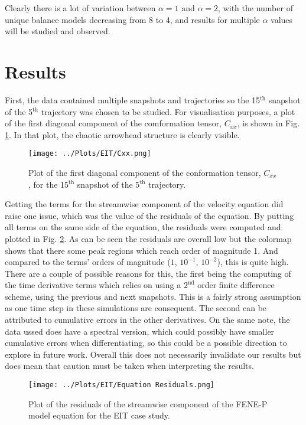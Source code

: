 \documentclass[12pt]{report} %
\begin{document}
Clearly there is a lot of variation between $\alpha =1$ and $\alpha = 2$, with the number of unique balance models decreasing from 8 to 4, and results for multiple $\alpha$ values will be studied and observed.

\newpage

\section{Results}

First, the data contained multiple snapshots and trajectories so the 15$^{\text{th}}$ snapshot of the 5$^{\text{th}}$ trajectory was chosen to be studied. For visualisation purposes, a plot of the first diagonal component of the comformation tensor, $C_{xx}$, is shown in Fig. \ref{fig:EIT_Cxx}. In that plot, the chaotic arrowhead structure is clearly visible.

\begin{figure}[htbp]
  \centering
  \texttt{[image: ../Plots/EIT/Cxx.png]}
  \caption{Plot of the first diagonal component of the conformation tensor, $C_{xx}$, for the 15$^{\text{th}}$ snapshot of the 5$^{\text{th}}$ trajectory.}
  \label{fig:EIT_Cxx}
\end{figure}

Getting the terms for the streamwise component of the velocity equation did raise one issue, which was the value of the residuals of the equation. By putting all terms on the same side of the equation, the residuals were computed and plotted in Fig. \ref{fig:EIT_residuals}. As can be seen the residuals are overall low but the colormap shows that there some peak regions which reach order of magnitude 1. And compared to the terms' orders of magnitude ($1$, $10^{-1}$, $10^{-2}$), this is quite high. There are a couple of possible reasons for this, the first being the computing of the time derivative terms which relies on using a $2^{\text{nd}}$ order finite difference scheme, using the previous and next snapshots. This is a fairly strong assumption as one time step in these simulations are consequent. The second can be attributed to cumulative errors in the other derivatives. On the same note, the data ussed does have a spectral version, which could possibly have smaller cumulative errors when differentiating, so this could be a possible direction to explore in future work. Overall this does not necessarily invalidate our results but does mean that caution must be taken when interpreting the results.


\begin{figure}[htbp]
  \centering
  \texttt{[image: ../Plots/EIT/Equation Residuals.png]}
  \caption{Plot of the residuals of the streamwise component of the FENE-P model equation for the EIT case study.}
  \label{fig:EIT_residuals}
\end{figure}
\end{document}
